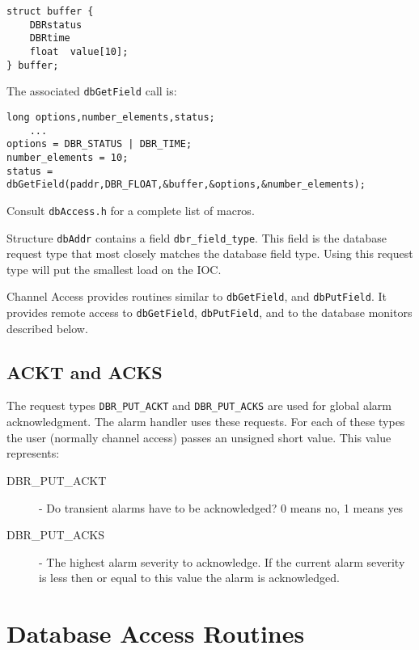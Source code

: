 \begin{verbatim}
struct buffer {
    DBRstatus
    DBRtime
    float  value[10];
} buffer;
\end{verbatim}

The associated \verb|dbGetField| call is:

\begin{verbatim}
long options,number_elements,status;
    ...
options = DBR_STATUS | DBR_TIME;
number_elements = 10;
status = dbGetField(paddr,DBR_FLOAT,&buffer,&options,&number_elements);
\end{verbatim}

Consult \verb|dbAccess.h| for a complete list of macros.

Structure \verb|dbAddr| contains a field \verb|dbr_field_type|.
This field is the database request type that most closely matches the database field type.
Using this request type will put the smallest load on the IOC.

Channel Access provides routines similar to \verb|dbGetField|, and \verb|dbPutField|.
It provides remote access to \verb|dbGetField|, \verb|dbPutField|, and to the database monitors described below.

\subsection{ACKT and ACKS}

The request types \verb|DBR_PUT_ACKT| and \verb|DBR_PUT_ACKS| are used for global alarm acknowledgment.
The alarm handler uses these requests.
For each of these types the user (normally channel access) passes an unsigned short value.
This value represents:

\begin{description}

\item[DBR\_PUT\_ACKT]  - Do transient alarms have to be acknowledged? 0 means no, 1 means yes

\item[DBR\_PUT\_ACKS] - The highest alarm severity to acknowledge.
If the current alarm severity is less then or equal to this value the alarm is acknowledged.

\end{description}

\section{Database Access Routines}

